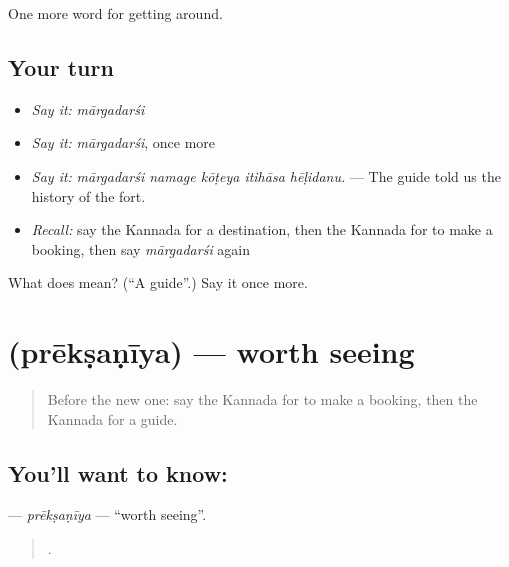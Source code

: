 \begin{grammarlens}[title={What you've built}]
One more word for getting around.
\end{grammarlens}

\subsection*{Your turn}
\begin{itemize}
\raggedright
  \item \emph{Say it:} \emph{mārgadarśi}
  \item \emph{Say it:} \emph{mārgadarśi}, once more
  \item \emph{Say it:} \emph{mārgadarśi namage kōṭeya itihāsa hēḷidanu.} — The guide told us the history of the fort.
  \item \emph{Recall:} say the Kannada for a destination, then the Kannada for to make a booking, then say \emph{mārgadarśi} again
\end{itemize}

\begin{tcolorbox}[breakable,colback=teal!4,colframe=teal!35!black,title={Before you move on}]
What does  mean? (\textquotedblleft{}A guide\textquotedblright{}.) Say it once more.
\end{tcolorbox}
\section[\texorpdfstring{\kn{ಪ್ರೇಕ್ಷಣೀಯ} (prēkṣaṇīya)}{ಪ್ರೇಕ್ಷಣೀಯ (prēkṣaṇīya)}]{ (prēkṣaṇīya) — worth seeing}

\label{lesson:KA-C455-preksaniya}



\begin{quote}
Before the new one: say the Kannada for to make a booking, then the Kannada for a guide.
\end{quote}

\subsection*{You'll want to know: }
\textbf{} — \emph{prēkṣaṇīya} — \textquotedblleft{}worth seeing\textquotedblright{}.

\begin{quote}
    .
\end{quote}

